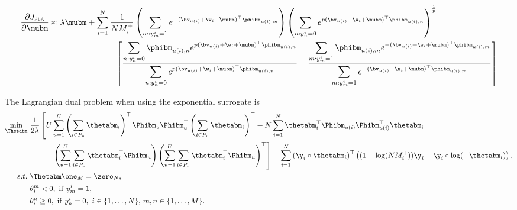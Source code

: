 \begin{equation*}
\begin{aligned}
%
\frac{\partial J_\textsc{pla}}{\partial \mubm}
&\approx \lambda \mubm
  + \sum_{i=1}^N \frac{1}{N M_i^+} 
    \left( \sum_{m: y_m^i = 1} e^{-(\bv_{u(i)} + \w_i + \mubm)^\top \phibm_{u(i),m}} \right)
    \left( \sum_{n: y_n^i = 0} e^{p (\bv_{u(i)} + \w_i + \mubm)^\top \phibm_{u(i),n}} \right)^\frac{1}{p} \\
& \hspace{8em} \left[ 
    \frac{ \displaystyle \sum_{n: y_n^i = 0} \phibm_{u(i),n} e^{p (\bv_{u(i)} + \w_i + \mubm)^\top \phibm_{u(i),n}} }
         { \displaystyle \sum_{n: y_n^i = 0} e^{p (\bv_{u(i)} + \w_i + \mubm)^\top \phibm_{u(i),n}} }
    - \frac{ \displaystyle \sum_{m: y_m^i = 1} \phibm_{u(i),m} e^{-(\bv_{u(i)} + \w_i + \mubm)^\top \phibm_{u(i),m}} }
           { \displaystyle \sum_{m: y_m^i = 1} e^{-(\bv_{u(i)} + \w_i + \mubm)^\top \phibm_{u(i),m}} } \right]
\end{aligned}
\end{equation*}


The Lagrangian dual problem when using the exponential surrogate is
\begin{equation}
\label{eq:dual_pla}
\begin{aligned}
\min_{\Thetabm} \ & \frac{1}{2 \lambda} \left[
     U \sum_{u=1}^U \left( \sum_{i \in P_u} \thetabm_i \right)^\top \Phibm_u \Phibm_u^\top \left( \sum_{i \in P_u} \thetabm_i \right)^\top
   + N \sum_{i=1}^N \thetabm_i^\top \Phibm_{u(i)} \Phibm_{u(i)}^\top \thetabm_i \right. \\
& \hspace{2em} \left.
   + \left( \sum_{u=1}^U \sum_{i \in P_u} \thetabm_i^\top \Phibm_u \right)
     \left( \sum_{u=1}^U \sum_{i \in P_u} \thetabm_i^\top \Phibm_u \right)^\top \right]
   + \sum_{i=1}^N \left( \y_i \circ \thetabm_i \right)^\top 
     \left( (1 - \log(N M_i^+)) \y_i - \y_i \circ \log(-\thetabm_i) \right), \\
s.t. \ 
& \Thetabm \one_M = \zero_N, \\
&\theta_i^m < 0, \ \mathrm{if} \ y_m^i = 1, \\
&\theta_i^n \ge 0, \ \mathrm{if} \ y_n^i = 0, \ i \in \{1,\dots,N\}, \, m,n \in \{1,\dots,M\}.
\end{aligned}
\end{equation}

